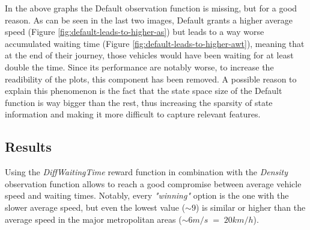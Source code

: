 In the above graphs the Default observation function is missing, but for a good reason.
As can be seen in the last two images, Default grants a higher average speed (Figure \ref{fig:default-leads-to-higher-as}) but leads to a way worse accumulated waiting time (Figure \ref{fig:default-leads-to-higher-awt}), meaning that at the end of their journey, those vehicles would have been waiting for at least double the time.
Since its performance are notably worse, to increase the readibility of the plots, this component has been removed.
A possible reason to explain this phenomenon is the fact that the state space size of the Default function is way bigger than the rest, thus increasing the sparsity of state information and making it more difficult to capture relevant features.


\subsection{Results}

Using the \textit{DiffWaitingTime} reward function in combination with the \textit{Density} observation function allows to reach a good compromise between average vehicle speed and waiting times.
Notably, every \textit{"winning"} option is the one with the slower average speed, but even the lowest value ($\sim9$) is similar or higher than the average speed in the major metropolitan areas ($\sim 6 m/s \; = \; 20 km/h$).

